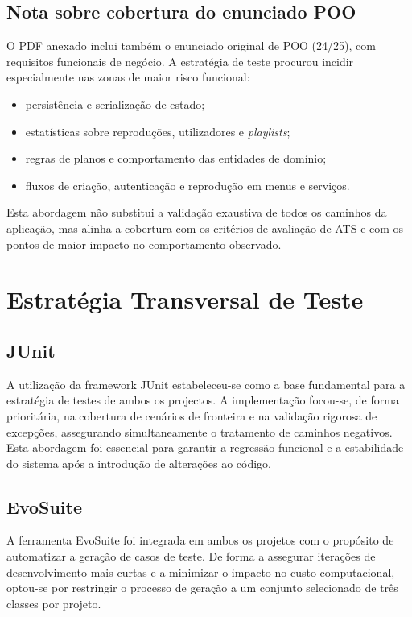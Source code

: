 \documentclass{article}
\begin{document}
\subsection{Nota sobre cobertura do enunciado POO}

O PDF anexado inclui também o enunciado original de POO (24/25), com requisitos funcionais de negócio. A estratégia de teste procurou incidir especialmente nas zonas de maior risco funcional:
\begin{itemize}
    \item persistência e serialização de estado;
    \item estatísticas sobre reproduções, utilizadores e \emph{playlists};
    \item regras de planos e comportamento das entidades de domínio;
    \item fluxos de criação, autenticação e reprodução em menus e serviços.
\end{itemize}

Esta abordagem não substitui a validação exaustiva de todos os caminhos da aplicação, mas alinha a cobertura com os critérios de avaliação de ATS e com os pontos de maior impacto no comportamento observado.

\section{Estratégia Transversal de Teste}

\subsection{JUnit}

A utilização da framework JUnit estabeleceu-se como a base fundamental para a estratégia de testes de ambos os projectos. A implementação focou-se, de forma prioritária, na cobertura de cenários de fronteira e na validação rigorosa de excepções, assegurando simultaneamente o tratamento de caminhos negativos. Esta abordagem foi essencial para garantir a regressão funcional e a estabilidade do sistema após a introdução de alterações ao código.

\subsection{EvoSuite}

A ferramenta EvoSuite foi integrada em ambos os projetos com o propósito de automatizar a geração de casos de teste. De forma a assegurar iterações de desenvolvimento mais curtas e a minimizar o impacto no custo computacional, optou-se por restringir o processo de geração a um conjunto selecionado de três classes por projeto.
\end{document}
